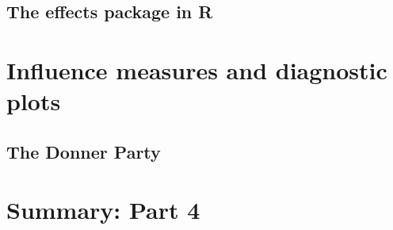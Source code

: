 \subsection{The effects package in R}



\section{Influence measures and diagnostic plots}
%




\subsection{The Donner Party}

\section{Summary: Part 4}


